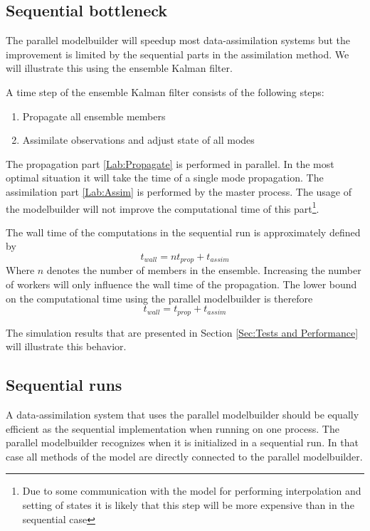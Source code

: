 \subsection{Sequential bottleneck}
The parallel modelbuilder will speedup most data-assimilation systems but
the improvement is limited by the sequential parts in the assimilation
method. We will illustrate this using the ensemble Kalman filter. 

A time step of the ensemble Kalman filter consists of the following steps:
\begin{enumerate}
\item \label{Lab:Propagate} Propagate all ensemble members
\item \label{Lab:Assim} Assimilate observations and adjust state of all modes
\end{enumerate}

The propagation part \ref{Lab:Propagate} is performed in parallel. In the
most optimal situation it will take the time of a single mode propagation.
The assimilation part \ref{Lab:Assim} is performed by the master process.
The usage of the modelbuilder will not improve the computational time of
this part\footnote{Due to some communication with the model for performing
interpolation and setting of states it is likely that this step will be
more expensive than in the sequential case}.

The wall time of the computations in the sequential run is approximately
defined by
\begin{equation}
t_{wall}=n t_{prop} + t_{assim}
\end{equation}
Where $n$ denotes the number of members in the ensemble. Increasing the
number of workers will only influence the wall time of the propagation. The
lower bound on the computational time using the parallel modelbuilder is
therefore
\begin{equation}
t_{wall}=t_{prop} + t_{assim}
\end{equation}

The simulation results that are presented in Section \ref{Sec:Tests and
Performance} will illustrate this behavior.

\subsection{Sequential runs}
A data-assimilation system that uses the parallel modelbuilder should be
equally efficient as the sequential implementation when running on one
process. The parallel modelbuilder recognizes when it is initialized in a
sequential run. In that case all methods of the model are directly
connected to the parallel modelbuilder.

